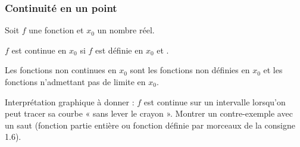 \subsubsection{Continuité en un point}%
\begin{definition}
	Soit $f$ une fonction et $x_0$ un nombre réel.
	\par $f$ est continue en $x_0$ si $f$ est définie en $x_0$ et .
\end{definition}%
\begin{remark}
Les fonctions non continues en $x_0$ sont les fonctions non définies en $x_0$ et les fonctions n'admettant pas de limite en $x_0$.
\end{remark}%
\begin{noteprof}
Interprétation graphique à donner : $f$ est continue sur un intervalle lorsqu'on peut tracer sa courbe « sans lever le crayon ». Montrer un contre-exemple avec un saut (fonction partie entière ou fonction définie par morceaux de la consigne 1.6).
\end{noteprof}
